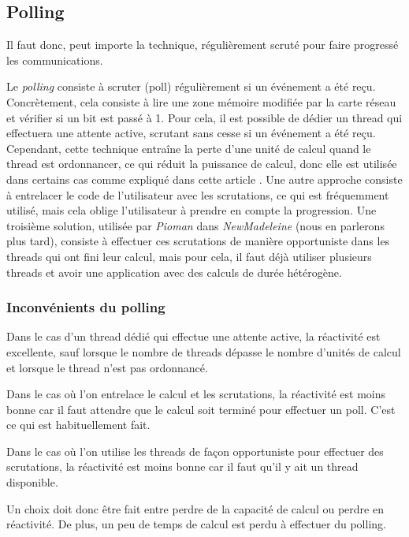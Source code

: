 \subsection{Polling}
\label{sec:polling}

Il faut donc, peut importe la technique, régulièrement scruté pour faire progressé les communications.


Le \emph{polling} consiste à scruter (poll) régulièrement si un événement a été reçu.
Concrètement, cela consiste à lire une zone mémoire modifiée par la carte réseau et vérifier si un bit est passé à 1.
Pour cela, il est possible de dédier un thread qui effectuera une attente active, scrutant sans cesse si un événement a été reçu.
Cependant, cette technique entraîne la perte d'une unité de calcul quand le thread est ordonnancer, ce qui réduit la puissance de calcul, donc elle est utilisée dans certains cas comme expliqué dans cette article \cite{denis:hal-03695835}.
Une autre approche consiste à entrelacer le code de l'utilisateur avec les scrutations, ce qui est fréquemment utilisé, mais cela oblige l'utilisateur à prendre en compte la progression.
Une troisième solution, utilisée par \emph{Pioman} dans \emph{NewMadeleine} (nous en parlerons plus tard), consiste à effectuer ces scrutations de manière opportuniste dans les threads qui ont fini leur calcul, mais pour cela, il faut déjà utiliser plusieurs threads et avoir une application avec des calculs de durée hétérogène.

\subsubsection{Inconvénients du polling}


Dans le cas d'un thread dédié qui effectue une attente active, la réactivité est excellente, sauf lorsque le nombre de threads dépasse le nombre d'unités de calcul et lorsque le thread n'est pas ordonnancé.

Dans le cas où l'on entrelace le calcul et les scrutations, la réactivité est moins bonne car il faut attendre que le calcul soit terminé pour effectuer un poll.
C'est ce qui est habituellement fait.

Dans le cas où l'on utilise les threads de façon opportuniste pour effectuer des scrutations, la réactivité est moins bonne car il faut qu'il y ait un thread disponible.

Un choix doit donc être fait entre perdre de la capacité de calcul ou perdre en réactivité.
De plus, un peu de temps de calcul est perdu à effectuer du polling.

